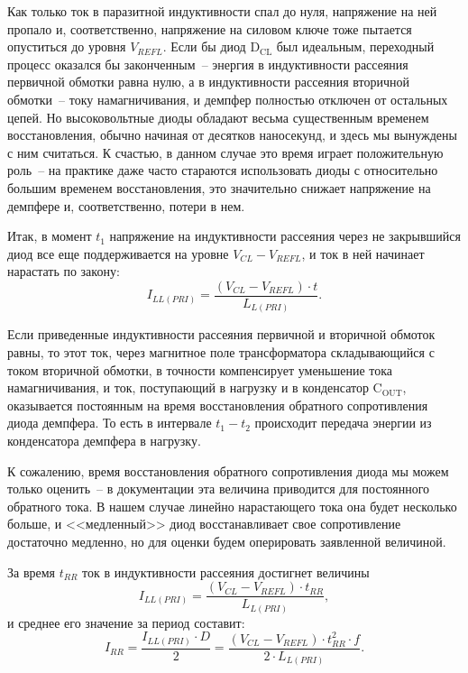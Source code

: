Как только ток в паразитной индуктивности спал до нуля, напряжение на ней пропало и, 
соответственно, напряжение на силовом ключе тоже пытается опуститься до уровня
\( V_{REFL} \). Если бы диод \( \mathrm{D_{CL}} \) был идеальным, переходный
процесс оказался бы законченным~-- энергия в индуктивности рассеяния первичной
обмотки равна нулю, а в индуктивности рассеяния вторичной обмотки~-- току
намагничивания, и демпфер полностью отключен от остальных цепей. Но
высоковольтные диоды обладают весьма существенным временем восстановления,
обычно начиная от десятков наносекунд, и здесь мы вынуждены с ним считаться. К
счастью, в данном случае это время играет положительную роль~-- на практике даже
часто стараются использовать диоды с относительно большим временем
восстановления, это значительно снижает напряжение на демпфере и,
соответственно, потери в нем.

Итак, в момент \( t_1 \) напряжение на индуктивности рассеяния через не
закрывшийся диод все еще поддерживается на уровне \( V_{CL} - V_{REFL} \), и
ток в ней начинает нарастать по закону:
\begin{equation}
	I_{LL(PRI)} = \frac{(V_{CL} - V_{REFL})\cdot t}{L_{L(PRI)}}.
\end{equation}

Если приведенные индуктивности рассеяния первичной и вторичной обмоток равны, то
этот ток, через магнитное поле трансформатора складывающийся с током вторичной
обмотки, в точности компенсирует уменьшение тока намагничивания, и ток,
поступающий в нагрузку и в конденсатор \( \mathrm{C_{OUT}} \), оказывается
постоянным на время восстановления обратного сопротивления диода демпфера. То
есть в интервале \( t_1 - t_2 \) происходит передача энергии из конденсатора
демпфера в нагрузку.

К сожалению, время восстановления обратного сопротивления диода мы можем только
оценить~-- в документации эта величина приводится для постоянного обратного
тока. В нашем случае линейно нарастающего тока она будет несколько больше, и
<<медленный>> диод восстанавливает свое сопротивление достаточно медленно, но
для оценки будем оперировать заявленной величиной.

За время \( t_{RR} \) ток в индуктивности рассеяния достигнет величины
\begin{equation}
	I_{LL(PRI)} = \frac{(V_{CL} - V_{REFL})\cdot t_{RR}}{L_{L(PRI)}},
\end{equation}
и среднее его значение за период составит:
\begin{equation}
	I_{RR} = \frac{I_{LL(PRI)}\cdot D}{2} = \frac{(V_{CL} - V_{REFL})\cdot t_{RR}^2
	\cdot f}{2\cdot L_{L(PRI)}}.
\end{equation}

